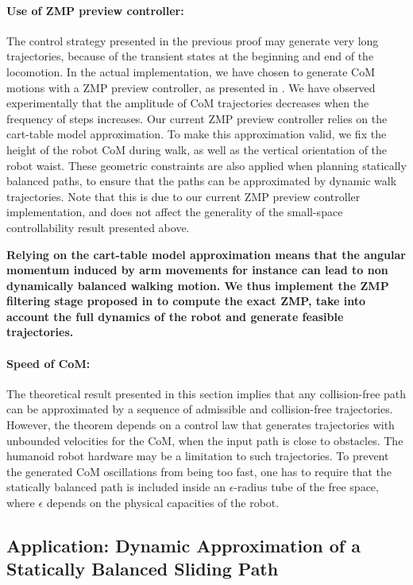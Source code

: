 \documentclass{article}
\begin{document}
\paragraph{Use of ZMP preview controller:} The control strategy presented in the  
previous proof may
generate very  long trajectories, because  of the transient  states at
the beginning and end of the locomotion. In the actual implementation,
we have chosen  to generate  CoM motions with  a ZMP preview  controller, as
presented in \cite{kajita2003biped}.  We  have observed experimentally that the
amplitude of  CoM trajectories decreases  when the frequency  of steps
increases. Our current ZMP preview controller relies on the cart-table model approximation.
To make this approximation valid, we fix the height of the robot CoM during walk,
as well as the vertical orientation of the robot waist. These geometric constraints 
are also applied when planning statically balanced paths, to ensure that the paths
can be approximated by dynamic walk trajectories. Note that this is
due to our current  ZMP preview controller implementation, and does not affect
the generality of the small-space controllability result presented above.

\textbf{Relying on the cart-table model approximation means that the
  angular momentum induced by arm movements for instance can lead to
  non dynamically balanced walking motion. We thus implement the ZMP
  filtering stage proposed in \cite{kajita2003biped} to compute the
  exact ZMP, take into account the full dynamics of the robot and
  generate feasible trajectories.}

\paragraph{Speed of CoM:} The theoretical result presented in this section implies
that any collision-free path can be approximated by a sequence of admissible 
and collision-free trajectories. However, the theorem depends on a control law
that generates trajectories with unbounded velocities for the CoM, when the input
path is close to obstacles. The humanoid robot
hardware may be a limitation to such trajectories. To prevent the generated CoM 
oscillations from being too fast, one has to require that the statically balanced 
path is included
inside an $\epsilon$-radius tube of the free space, where $\epsilon$ depends on the
physical capacities of the robot.




\subsection{Application: Dynamic Approximation of a Statically Balanced Sliding Path}
\label{sec:ssc-application}
\end{document}
